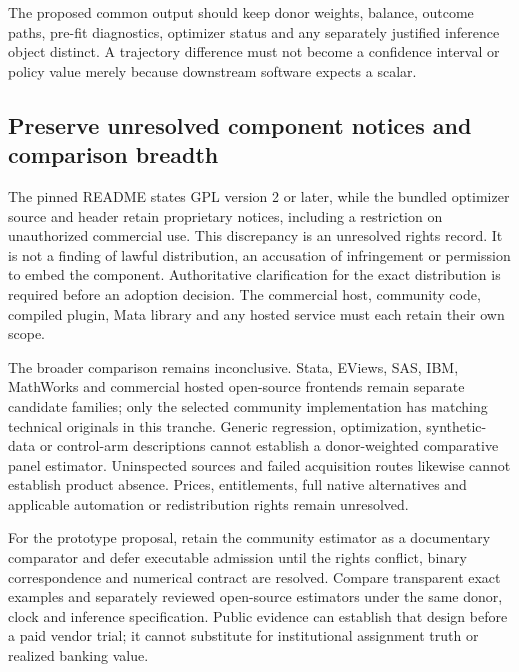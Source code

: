 The proposed common output should keep donor weights, balance, outcome paths,
pre-fit diagnostics, optimizer status and any separately justified inference
object distinct. A trajectory difference must not become a confidence interval
or policy value merely because downstream software expects a scalar.

\subsection{Preserve unresolved component notices and comparison breadth}
\label{exec19:synth-rights}

The pinned README states GPL version 2 or later, while the bundled optimizer
source and header retain proprietary notices, including a restriction on
unauthorized commercial use. This discrepancy is an unresolved rights record.
It is not a finding of lawful distribution, an accusation of infringement or
permission to embed the component. Authoritative clarification for the exact
distribution is required before an adoption decision. The commercial host,
community code, compiled plugin, Mata library and any hosted service must each
retain their own scope.~\citep{exec19_synth_stata_source}

The broader comparison remains inconclusive. Stata, EViews, SAS, IBM,
MathWorks and commercial hosted open-source frontends remain separate candidate
families; only the selected community implementation has matching technical
originals in this tranche. Generic regression, optimization, synthetic-data or
control-arm descriptions cannot establish a donor-weighted comparative panel
estimator. Uninspected sources and failed acquisition routes likewise cannot
establish product absence. Prices, entitlements, full native alternatives and
applicable automation or redistribution rights remain unresolved.

For the prototype proposal, retain the community estimator as a documentary
comparator and defer executable admission until the rights conflict, binary
correspondence and numerical contract are resolved. Compare transparent exact
examples and separately reviewed open-source estimators under the same donor,
clock and inference specification. Public evidence can establish that design
before a paid vendor trial; it cannot substitute for institutional assignment
truth or realized banking value.
